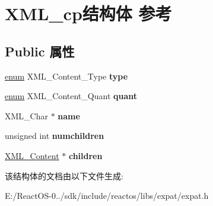 \hypertarget{struct_x_m_l__cp}{}\section{X\+M\+L\+\_\+cp结构体 参考}
\label{struct_x_m_l__cp}
\subsection*{Public 属性}
\begin{DoxyCompactItemize}
\item 
\mbox{\label{struct_x_m_l__cp_a98deeadbd7d0e20387a29f9030c2a397}} 
\hyperlink{interfaceenum}{enum} X\+M\+L\+\_\+\+Content\+\_\+\+Type {\bfseries type}
\item 
\mbox{\label{struct_x_m_l__cp_a85e6c8f3118df403b0d15491c93ae9e7}} 
\hyperlink{interfaceenum}{enum} X\+M\+L\+\_\+\+Content\+\_\+\+Quant {\bfseries quant}
\item 
\mbox{\label{struct_x_m_l__cp_a7f06eaeb1604d4c2f2fa19f4dd13167c}} 
X\+M\+L\+\_\+\+Char $\ast$ {\bfseries name}
\item 
\mbox{\label{struct_x_m_l__cp_a5395f658297ee88a3ab45dfdbe389ef1}} 
unsigned int {\bfseries numchildren}
\item 
\mbox{\label{struct_x_m_l__cp_a09c80a4bc4a029f785e262e9ca166b79}} 
\hyperlink{struct_x_m_l__cp}{X\+M\+L\+\_\+\+Content} $\ast$ {\bfseries children}
\end{DoxyCompactItemize}


该结构体的文档由以下文件生成\+:\begin{DoxyCompactItemize}
\item 
E\+:/\+React\+O\+S-\/0../sdk/include/reactos/libs/expat/expat.\+h\end{DoxyCompactItemize}
